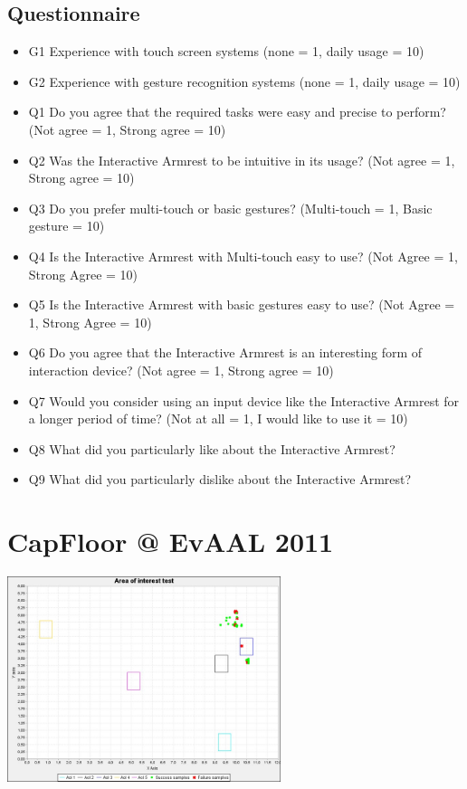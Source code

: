 \subsection{Questionnaire}
\begin{itemize}
\item G1 Experience with touch screen systems (none = 1, daily usage = 10)
\item G2 Experience with gesture recognition systems (none = 1, daily usage = 10)
\item Q1 Do you agree that the required tasks were easy and precise to perform? (Not agree = 1, Strong agree = 10)
\item Q2 Was the Interactive Armrest to be intuitive in its usage? (Not agree = 1, Strong agree = 10)
\item Q3 Do you prefer multi-touch or basic gestures?
(Multi-touch = 1, Basic gesture = 10)
\item Q4 Is the Interactive Armrest with Multi-touch easy to use? (Not Agree = 1, Strong Agree = 10)
\item Q5 Is the Interactive Armrest with basic gestures easy to use? (Not Agree = 1, Strong Agree = 10)
\item Q6 Do you agree that the Interactive Armrest is an interesting form of interaction device? (Not agree = 1, Strong agree = 10)
\item Q7 Would you consider using an input device like the Interactive Armrest for a longer period of time? (Not at all = 1, I would like to use it = 10)
\item Q8 What did you particularly like about the Interactive Armrest?
\item Q9 What did you particularly dislike about the Interactive Armrest?
\end{itemize}

\section{CapFloor @ EvAAL 2011}
\begin{minipage}{\linewidth}
\centering
\includegraphics[width=0.6\textwidth]{images/eval_evaal_aoi}
\label{fig:eval_evaal_aoi}
\end{minipage}

